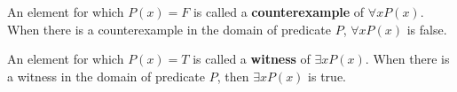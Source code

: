 
An element for which $P(x) = F$ is called a {\bf counterexample} of $\forall x P(x)$. When there is a counterexample in the domain of predicate $P$,  $\forall x P(x)$ is false.


An element for which $P(x) = T$ is called a {\bf witness} of $\exists x P(x)$. When there is a witness in the domain of predicate $P$, then $\exists x P(x)$ is true.
